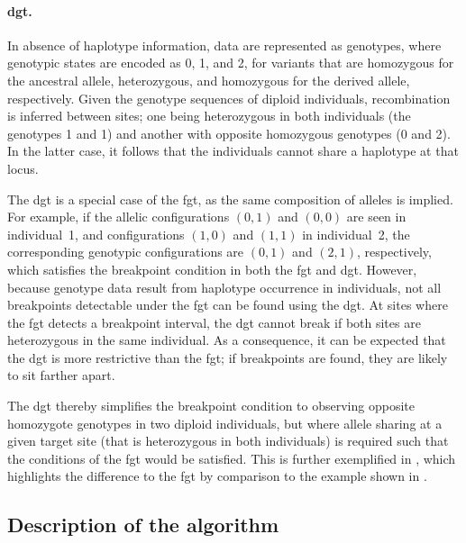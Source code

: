 \paragraph{\Gls{dgt}.}
In absence of haplotype information, data are represented as genotypes, where genotypic states are encoded as 0, 1, and 2, for variants that are homozygous for the ancestral allele, heterozygous, and homozygous for the derived allele, respectively.
Given the genotype sequences of  diploid individuals, recombination is inferred between  sites; one being heterozygous in both individuals (\ie the genotypes 1 and 1) and another with opposite homozygous genotypes (0 and 2).
In the latter case, it follows that the  individuals cannot share a haplotype at that locus.

The \gls{dgt} is a special case of the \gls{fgt}, as the same composition of alleles is implied.
For example, if the allelic configurations ${(0,1)}$ and ${(0,0)}$ are seen in individual~1, and configurations ${(1,0)}$ and ${(1,1)}$ in individual~2, the corresponding genotypic configurations are ${(0,1)}$ and ${(2,1)}$, respectively, which satisfies the breakpoint condition in both the \gls{fgt} and \gls{dgt}.
However, because genotype data result from haplotype occurrence in individuals, not all breakpoints detectable under the \gls{fgt} can be found using the \gls{dgt}.
At sites where the \gls{fgt} detects a breakpoint interval, the \gls{dgt} cannot break if both sites are heterozygous in the same individual.
As a consequence, it can be expected that the \gls{dgt} is more restrictive than the \gls{fgt}; \eg if breakpoints are found, they are likely to sit farther apart.

%

%

The \gls{dgt} thereby simplifies the breakpoint condition to observing opposite homozygote genotypes in two diploid individuals, but where allele sharing at a given target site (that is heterozygous in both individuals) is required such that the conditions of the \gls{fgt} would be satisfied.
This is further exemplified in , which highlights the difference to the \gls{fgt} by comparison to the example shown in .


%
\subsection{Description of the algorithm}\label{sec:ibd_detect_alg}
%

